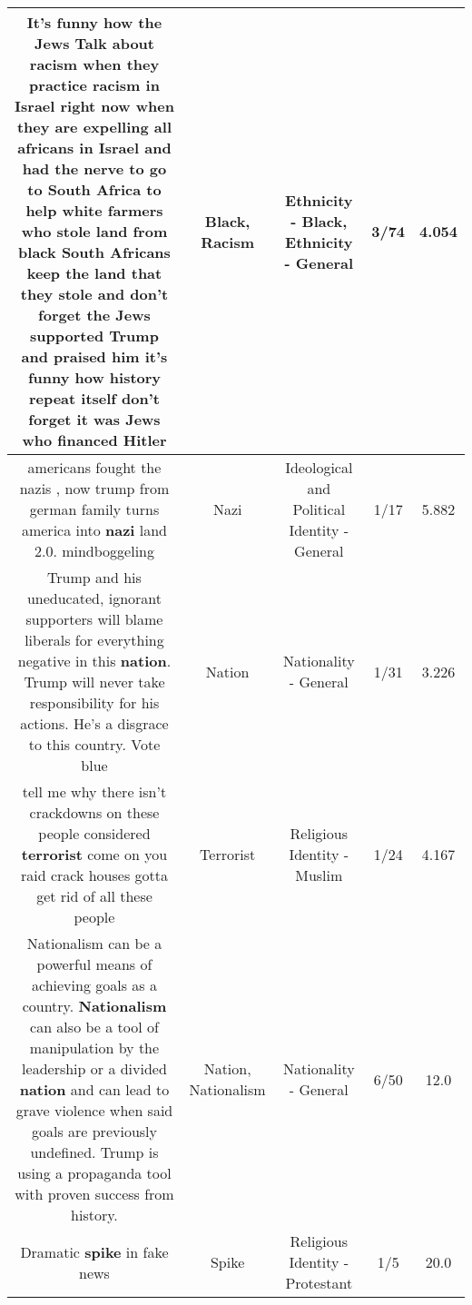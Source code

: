 \documentclass[11pt]{article}
\newlength\mylength
\begin{document}
\begin{center}
\begin{longtable}{|C{.65\mylength}|C{.30\mylength}|C{.12\mylength}|C{.12\mylength}|C{.12\mylength}|}
  \small It's funny how the Jews Talk about \textbf{racism} when they practice \textbf{racism} in Israel right now when they are expelling all africans in Israel and had the nerve to go to South Africa to help white farmers  who stole land from \textbf{black} South Africans keep the land that they stole and don't forget the Jews supported Trump and praised him it's funny how history repeat itself don't forget it was Jews  who financed Hitler\normalsize   & Black, Racism & Ethnicity - Black, Ethnicity - General & 3/74 & 4.054 \\  \hline
  \small americans fought the nazis , now trump from german family turns america into \textbf{nazi} land 2.0.    mindboggeling\normalsize   & Nazi &  Ideological and Political Identity - General & 1/17 & 5.882 \\  \hline
  \small Trump and his uneducated, ignorant supporters will blame liberals for everything negative in this \textbf{nation}. Trump will never take responsibility for his actions. He's a disgrace to this country. Vote blue\normalsize   & Nation & Nationality - General & 1/31 & 3.226 \\  \hline
  \small tell me why there isn't crackdowns on these people considered \textbf{terrorist} come on you raid crack houses gotta get rid of all these people\normalsize   & Terrorist & Religious Identity - Muslim & 1/24 & 4.167 \\  \hline
  \small Nationalism can be a powerful means of achieving goals as a country. \textbf{Nationalism} can also be a tool of manipulation by the leadership or a divided \textbf{nation} and can lead to grave violence when said goals are previously undefined. Trump is using a propaganda tool with proven success from history.\normalsize   & Nation, Nationalism & Nationality - General & 6/50 & 12.0 \\  \hline
  \small Dramatic \textbf{spike} in fake news\normalsize   & Spike & Religious Identity - Protestant & 1/5 & 20.0 \\  \hline

\end{longtable}
\end{center}
\end{document}
